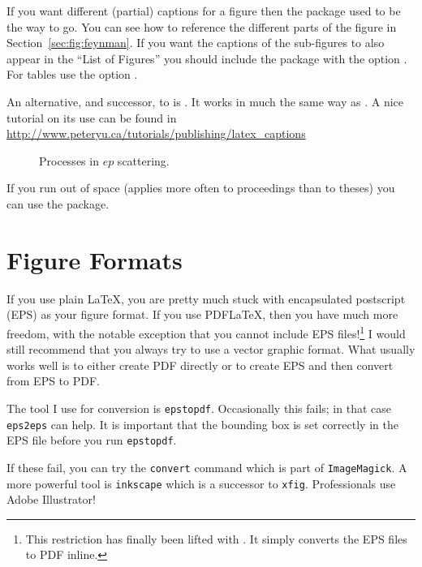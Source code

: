 If you want different (partial) captions for a figure then the
 package used to be the way to go. You can see how to
reference the different parts of the figure in
Section~\ref{sec:fig:feynman}. If you want the captions of the
sub-figures to also appear in the \enquote{List of Figures} you should
include the package with the option . For tables use
the option .

An alternative, and successor, to  is
. It works in much the same way as
. A nice tutorial on its use can be found in
\url{http://www.peteryu.ca/tutorials/publishing/latex_captions}

\begin{figure}[htbp]
  \centering
  \subfloat[NC scattering][NC]{\label{fig:nccc-nc}\texttt{[image: ep\_nc]}}
  \qquad
  \subfloat[CC scattering][CC]{\label{fig:nccc-cc}\texttt{[image: ep\_cc]}}
  \caption{Processes in $ep$ scattering.}
  \label{fig:nccc}
\end{figure}

If you run out of space (applies more often to proceedings than to
theses) you can use the  package.

\section{Figure Formats}
\label{sec:fig:formats}

If you use plain \LaTeX, you are pretty much stuck with encapsulated
postscript (EPS) as your figure format. If you use PDF\LaTeX, then you
have much more freedom, with the notable exception that you cannot
include EPS files!\footnote{%
This restriction has finally been lifted with . It
simply converts the EPS files to PDF inline.}
I would still recommend that you always try to use
a vector graphic format. What usually works well is to either create
PDF directly or to create EPS and then convert from EPS to PDF.

The tool I use for conversion is \texttt{epstopdf}. Occasionally this
fails; in that case \texttt{eps2eps} can help. It is important that
the bounding box is set correctly in the EPS file before you run
\texttt{epstopdf}.

If these fail, you can try the \texttt{convert} command which is part
of \texttt{ImageMagick}. A more powerful tool is \texttt{inkscape}
which is a successor to \texttt{xfig}. Professionals use Adobe Illustrator!


